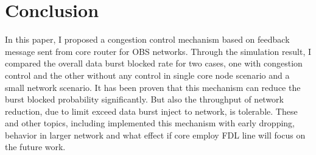 \section{Conclusion}

In this paper, I proposed a congestion control mechanism based on feedback message sent from core router for OBS networks. Through the simulation result, I compared the overall data burst blocked rate for two cases, one with congestion control and the other without any control in single core node scenario and a small network scenario. It has been proven that this mechanism can reduce the burst blocked probability significantly. But also the throughput of network reduction, due to limit exceed data
burst inject to network, is tolerable. These and other topics, including implemented this mechanism with early dropping, behavior in larger network and what effect if core employ FDL line will focus on the future work.
